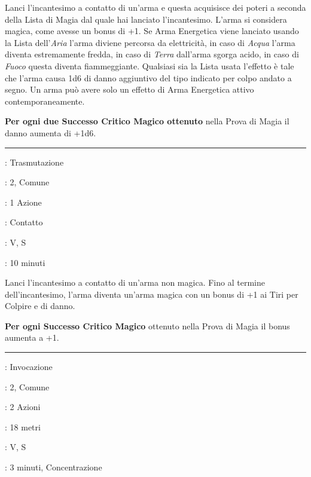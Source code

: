 \begin{multicols}{2}
Lanci l'incantesimo a contatto di un'arma e questa acquisisce dei poteri a seconda della Lista di Magia dal quale hai lanciato l'incantesimo. L'arma si considera magica, come avesse un bonus di +1.
Se Arma Energetica viene lanciato usando la Lista dell'\emph{Aria} l'arma diviene percorsa da elettricità, in caso di \emph{Acqua} l'arma diventa estremamente fredda, in caso di \emph{Terra} dall'arma sgorga acido, in caso di \emph{Fuoco} questa diventa fiammeggiante. Qualsiasi sia la Lista usata l'effetto è tale che l'arma causa 1d6 di danno aggiuntivo del tipo indicato per colpo andato a segno.
Un arma può avere solo un effetto di Arma Energetica attivo contemporaneamente.

\textbf{Per ogni due Successo Critico Magico ottenuto} nella Prova di Magia il danno aumenta di +1d6.

\smallskip\noindent\rule{\linewidth}{2pt} \hypertarget{Arma Magica}{}\medskip{}
\noindent
\begin{description}[noitemsep, topsep=0pt, parsep=0pt, partopsep=0pt, leftmargin=0cm, labelwidth=2.8cm]
	\item[\textbf{Lista di Magia}]: Trasmutazione
	\item[\textbf{Livello}]: 2, Comune
	\item[\textbf{T. di Lancio}]: 1 Azione
	\item[\textbf{Gittata}]: Contatto
	\item[\textbf{Componenti}]: V, S
	\item[\textbf{Durata}]: 10 minuti
\end{description}

Lanci l'incantesimo a contatto di un'arma non magica. Fino al termine dell'incantesimo, l'arma diventa un'arma magica con un bonus di +1 ai Tiri per Colpire e di danno.

\textbf{Per ogni Successo Critico Magico} ottenuto nella Prova di Magia il bonus aumenta a +1.

\smallskip\noindent\rule{\linewidth}{2pt} \hypertarget{Arma Spirituale}{}\medskip{}
\noindent
\begin{description}[noitemsep, topsep=0pt, parsep=0pt, partopsep=0pt, leftmargin=0cm, labelwidth=2.8cm]
	\item[\textbf{Lista di Magia}]: Invocazione
	\item[\textbf{Livello}]: 2, Comune
	\item[\textbf{T. di Lancio}]: 2 Azioni
	\item[\textbf{Gittata}]: 18 metri
	\item[\textbf{Componenti}]: V, S
	\item[\textbf{Durata}]: 3 minuti, Concentrazione
\end{description}


\end{multicols}
